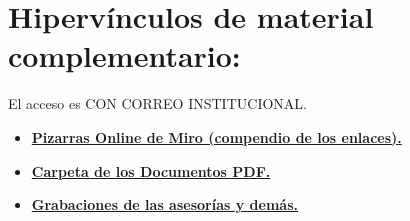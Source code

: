 \documentclass[letterpaper, 12pt]{article}
\begin{document}
    \section*{Hipervínculos de material complementario:}
    El acceso es CON CORREO INSTITUCIONAL.
    \begin{itemize}
        \item \href{https://docs.google.com/document/d/1mhFr7S5rJ7TwR297Kd6l8b6NPvYkUAlpWIxuz4VKV2w/edit?usp=sharing}{\textbf{Pizarras Online de Miro (compendio de los enlaces).}}
        \item \href{https://drive.google.com/drive/folders/1yL1gAIbVpgKB3h8498KFNE7NDZjoxIWa?usp=sharing}{\textbf{Carpeta de los Documentos PDF.}}
        \item \href{https://drive.google.com/drive/folders/1TPtNSe4ErSgaBLw2kgYDQadyXqvh6AYC?usp=sharing}{\textbf{Grabaciones de las asesorías y demás.}}
    \end{itemize}
\end{document}
